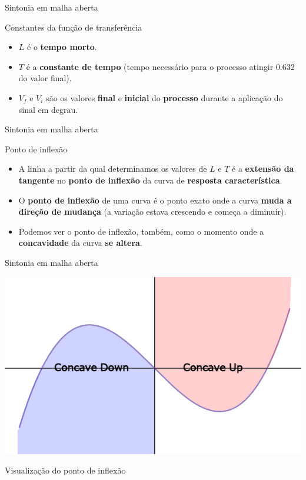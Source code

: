 \begin{frame}{Sintonia em malha aberta}
	\begin{block}{Constantes da função de transferência}
		\begin{itemize}
			\item $ L $ é o \textbf{tempo morto}.
			\item $ T $ é a \textbf{constante de tempo} (tempo necessário para o processo atingir \num{0.632} do valor final).
			\item $ V_f $ e $ V_i $ são os valores \textbf{final} e \textbf{inicial} do \textbf{processo} durante a aplicação do sinal em degrau.
		\end{itemize}
	\end{block}
	
	\centering
	\scalebox{1}{}
	
\end{frame}


\begin{frame}{Sintonia em malha aberta}
	\begin{block}{Ponto de inflexão}
		\begin{itemize}
			\item A linha a partir da qual determinamos os valores de $ L $ e $ T $ é a \textbf{extensão da tangente} no \textbf{ponto de inflexão} da curva de \textbf{resposta característica}.
			\item O \textbf{ponto de inflexão} de uma curva é o ponto exato onde a curva \textbf{muda a direção de mudança} (a variação estava crescendo e começa a diminuir).
			\item Podemos ver o ponto de inflexão, também, como o momento onde a \textbf{concavidade} da curva \textbf{se altera}.
		\end{itemize}
	\end{block}
\end{frame}


\begin{frame}{Sintonia em malha aberta}
	
	\centering
	\includegraphics[width=0.9\linewidth]{Figuras/Ch14/fig6}
	
	\bigskip
	
	Visualização do ponto de inflexão
\end{frame}


